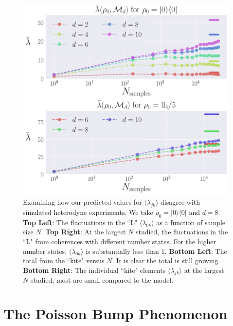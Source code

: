\documentclass[aps,pra, twocolumn]{revtex4}
\begin{document}
\begin{figure}[h]
  \includegraphics[width=\columnwidth]{Images/Figure_12.pdf}
 \caption{Examining how our predicted values for $\langle \lambda_{jk} \rangle$ disagree with simulated heterodyne experiments. We take $\rho_{0} = |0\rangle\langle 0|$ and $d=8$. \textbf{Top Left}: The fluctuations in the ``L" $\langle \lambda_{0k}\rangle$ as a function of sample size $N$.  \textbf{Top Right}: At the largest $N$ studied, the fluctuations in the ``L" from coherences with different number states. For the higher number states, $\langle \lambda_{0k}\rangle$ is substantially less than 1. \textbf{Bottom Left}: The total from the ``kite" versus $N$. It is clear the total is still growing. \textbf{Bottom Right}: The individual ``kite" elements $\langle \lambda_{jk}\rangle$ at the largest $N$ studied;  most are small compared to the model.}
\label{fig:individcontrib}
\end{figure}



\section{The Poisson Bump Phenomenon}
\label{app:poisson}
\end{document}
